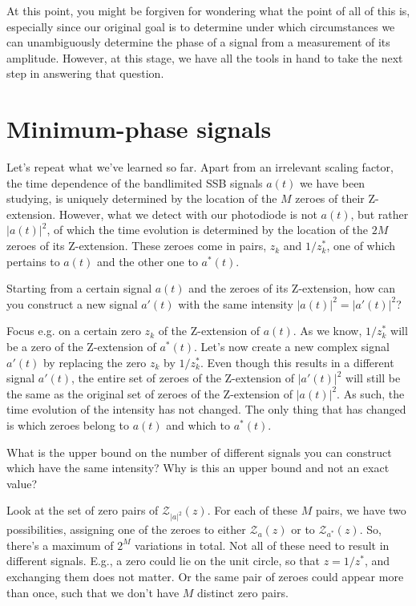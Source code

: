 At this point, you might be forgiven for wondering what the point of all of this is, especially since our original goal is to determine under which circumstances we can unambiguously determine the phase of a signal from a measurement of its amplitude. However, at this stage, we have all the tools in hand to take the next step in answering that question.

\pagebreak

\section{Minimum-phase signals}

Let's repeat what we've learned so far. Apart from an irrelevant scaling factor, the time dependence of the bandlimited SSB signals $a(t)$ we have been studying, is uniquely determined by the location of the $M$ zeroes of their Z-extension. However, what we detect with our photodiode is not $a(t)$, but rather $|a(t)|^2$, of which the time evolution is determined by the location of the $2M$ zeroes of its Z-extension. These zeroes come in pairs, $z_k$ and $1/z_k^*$, one of which pertains to $a(t)$ and the other one to $a^*(t)$.

\begin{cue}
Starting from a certain signal $a(t)$ and the zeroes of its Z-extension, how can you construct a new signal $a'(t)$ with the same intensity $|a(t)|^2=|a'(t)|^2$?   
\end{cue}

Focus e.g. on a certain zero $z_k$ of the Z-extension of $a(t)$. As we know, $1/z_k^*$ will be a zero of the Z-extension of $a^*(t)$. Let's now create a new complex signal $a'(t)$ by replacing the zero $z_k$ by $1/z_k^*$. Even though this results in a different signal $a'(t)$, the entire set of zeroes of the Z-extension of $|a'(t)|^2$ will still be the same as the original set of zeroes of the Z-extension of $|a(t)|^2$. As such, the time evolution of the intensity has not changed. The only thing that has changed is which zeroes belong to $a(t)$ and which to $a^*(t)$.

\begin{cue}
What is the upper bound on the number of different signals you can construct which have the same intensity? Why is this an upper bound and not an exact value?   
\end{cue}

Look at the set of zero pairs of $\mathcal{Z}_{|a|^2}(z)$. For each of these $M$ pairs, we have two possibilities, assigning one of the zeroes to either $\mathcal{Z}_{a}(z)$ or to $\mathcal{Z}_{a^*}(z)$. So, there's a maximum of $2^M$ variations in total. Not all of these need to result in different signals. E.g., a zero could lie on the unit circle, so that $z=1/z^*$, and exchanging them does not matter. Or the same pair of zeroes could appear more than once, such that we don't have $M$ distinct zero pairs.

